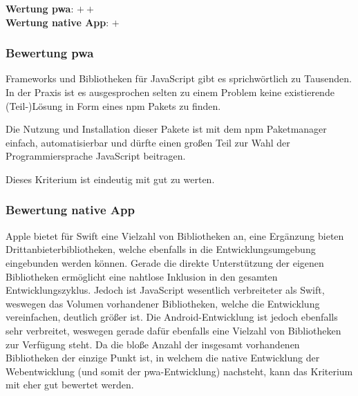 \textbf{Wertung \ac{pwa}}: $++$\\
\textbf{Wertung native App}: $+$ \\

\subsubsection{Bewertung \ac{pwa}}
Frameworks und Bibliotheken für JavaScript gibt es sprichwörtlich zu Tausenden. In der Praxis ist es ausgesprochen selten zu einem Problem keine existierende (Teil-)Lösung in Form eines npm Pakets zu finden.

Die Nutzung und Installation dieser Pakete ist mit dem npm Paketmanager einfach, automatisierbar und dürfte einen großen Teil zur Wahl der Programmiersprache JavaScript beitragen.

Dieses Kriterium ist eindeutig mit gut zu werten.

\subsubsection{Bewertung native App}
Apple bietet für Swift eine Vielzahl von Bibliotheken an, eine Ergänzung bieten Drittanbieterbibliotheken, welche ebenfalls in die Entwicklungsumgebung eingebunden werden können. Gerade die direkte Unterstützung der eigenen Bibliotheken ermöglicht eine nahtlose Inklusion in den gesamten Entwicklungszyklus. Jedoch ist JavaScript wesentlich verbreiteter als Swift, weswegen das Volumen vorhandener Bibliotheken, welche die Entwicklung vereinfachen, deutlich größer ist. Die Android-Entwicklung ist jedoch ebenfalls sehr verbreitet, weswegen gerade dafür ebenfalls eine Vielzahl von Bibliotheken zur Verfügung steht. Da die bloße Anzahl der insgesamt vorhandenen Bibliotheken der einzige Punkt ist, in welchem die native Entwicklung der Webentwicklung (und somit der \ac{pwa}-Entwicklung) nachsteht, kann das Kriterium mit eher gut bewertet werden.